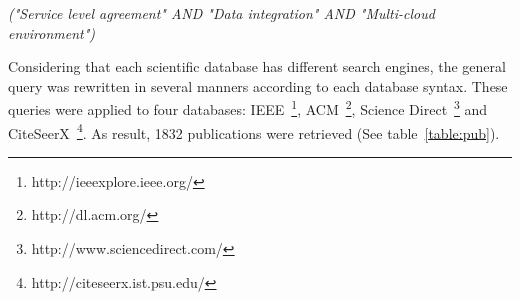 
\begin{center}
\textit{("Service level agreement" AND "Data integration" AND "Multi-cloud environment")} \\ 
\end{center}
\medskip

Considering that each scientific database has different search engines, the general query was 
rewritten in several manners according to each database syntax.
These queries were applied to four databases: IEEE~\footnote{http://ieeexplore.ieee.org/},
ACM~\footnote{http://dl.acm.org/}, Science Direct~\footnote{http://www.sciencedirect.com/} and
CiteSeerX~\footnote{http://citeseerx.ist.psu.edu/}.
As result, 1832 publications were retrieved (See table~\ref{table:pub}).


